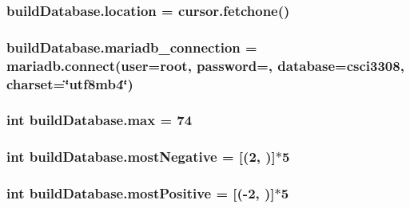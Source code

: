 \subsubsection[{\texorpdfstring{location}{location}}]{\setlength{\rightskip}{0pt plus 5cm}build\+Database.\+location = cursor.\+fetchone()}\hypertarget{namespacebuildDatabase_ad2781a91cbfcd21e5be44aae5d39d257}{}\label{namespacebuildDatabase_ad2781a91cbfcd21e5be44aae5d39d257}
\subsubsection[{\texorpdfstring{mariadb\+\_\+connection}{mariadb_connection}}]{\setlength{\rightskip}{0pt plus 5cm}build\+Database.\+mariadb\+\_\+connection = mariadb.\+connect(user=\textquotesingle{}root\textquotesingle{}, password=\textquotesingle{}\textquotesingle{}, database=\textquotesingle{}csci3308\textquotesingle{}, charset=\char`\"{}utf8mb4\char`\"{})}\hypertarget{namespacebuildDatabase_aeed13a096d6a186e5884c1465f8a703d}{}\label{namespacebuildDatabase_aeed13a096d6a186e5884c1465f8a703d}
\subsubsection[{\texorpdfstring{max}{max}}]{\setlength{\rightskip}{0pt plus 5cm}int build\+Database.\+max = 74}\hypertarget{namespacebuildDatabase_a4ef5ab993f0509faafc01ab906cf576b}{}\label{namespacebuildDatabase_a4ef5ab993f0509faafc01ab906cf576b}
\subsubsection[{\texorpdfstring{most\+Negative}{mostNegative}}]{\setlength{\rightskip}{0pt plus 5cm}int build\+Database.\+most\+Negative = \mbox{[}(2, \textquotesingle{}\textquotesingle{})\mbox{]}$\ast$5}\hypertarget{namespacebuildDatabase_adee8ced6b5216c8ebe3ad73fb6b9eb9a}{}\label{namespacebuildDatabase_adee8ced6b5216c8ebe3ad73fb6b9eb9a}
\subsubsection[{\texorpdfstring{most\+Positive}{mostPositive}}]{\setlength{\rightskip}{0pt plus 5cm}int build\+Database.\+most\+Positive = \mbox{[}(-\/2, \textquotesingle{}\textquotesingle{})\mbox{]}$\ast$5}\hypertarget{namespacebuildDatabase_a50f9b6bae964e6579ba92450127cf440}{}\label{namespacebuildDatabase_a50f9b6bae964e6579ba92450127cf440}
